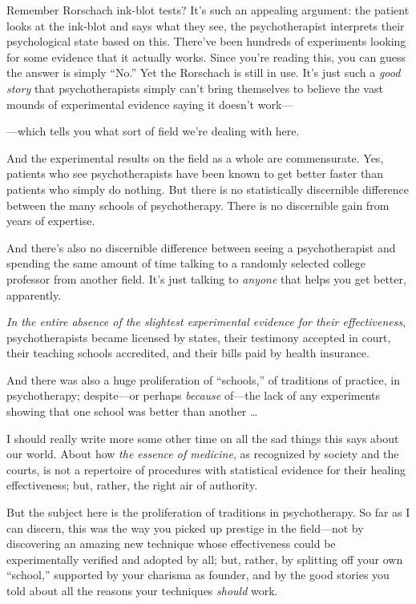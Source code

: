 {
 Remember Rorschach ink-blot tests? It's such an
appealing argument: the patient looks at the ink-blot and says what
they see, the psychotherapist interprets their psychological state
based on this. There've been hundreds of experiments
looking for some evidence that it actually works. Since
you're reading this, you can guess the answer is simply
``No.'' Yet the Rorschach is still
in use. It's just such a \textit{good story} that
psychotherapists simply can't bring themselves to
believe the vast mounds of experimental evidence saying it
doesn't work---}

{
 {}---which tells you what sort of field we're
dealing with here.}

{
 And the experimental results on the field as a whole are
commensurate. Yes, patients who see psychotherapists have been known to
get better faster than patients who simply do nothing. But there is no
statistically discernible difference between the many schools of
psychotherapy. There is no discernible gain from years of expertise.}

{
 And there's also no discernible difference between
seeing a psychotherapist and spending the same amount of time talking
to a randomly selected college professor from another field.
It's just talking to \textit{anyone} that helps you get
better, apparently.}

{
 \textit{In the entire absence of the slightest experimental
evidence for their effectiveness}, psychotherapists became licensed by
states, their testimony accepted in court, their teaching schools
accredited, and their bills paid by health insurance.}

{
 And there was also a huge proliferation of
``schools,'' of traditions of
practice, in psychotherapy; despite---or perhaps \textit{because}
of---the lack of any experiments showing that one school was better
than another \ldots}

{
 I should really write more some other time on all the sad things
this says about our world. About how \textit{the essence of medicine},
as recognized by society and the courts, is not a repertoire of
procedures with statistical evidence for their healing effectiveness;
but, rather, the right air of authority.}

{
 But the subject here is the proliferation of traditions in
psychotherapy. So far as I can discern, this was the way you picked up
prestige in the field---not by discovering an amazing new technique
whose effectiveness could be experimentally verified and adopted by
all; but, rather, by splitting off your own
``school,'' supported by your
charisma as founder, and by the good stories you told about all the
reasons your techniques \textit{should} work.}


